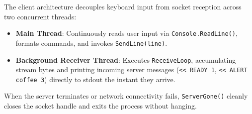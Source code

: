 \documentclass[11pt,a4paper]{article}
\begin{document}
\begin{enumerate}
    The client architecture decouples keyboard input from socket reception across two concurrent threads:
    \begin{itemize}
        \item \textbf{Main Thread}: Continuously reads user input via \texttt{Console.ReadLine()}, formats commands, and invokes \texttt{SendLine(line)}.
        \item \textbf{Background Receiver Thread}: Executes \texttt{ReceiveLoop}, accumulating stream bytes and printing incoming server messages (\texttt{<< READY 1}, \texttt{<< ALERT coffee 3}) directly to stdout the instant they arrive.
    \end{itemize}
    When the server terminates or network connectivity fails, \texttt{ServerGone()} cleanly closes the socket handle and exits the process without hanging.
\end{enumerate}
\end{document}
